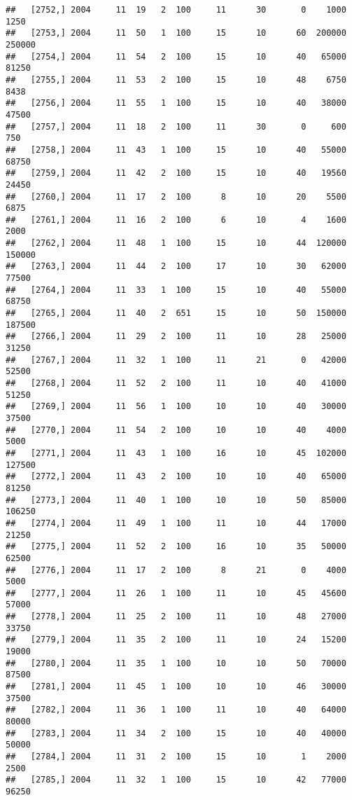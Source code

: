 \documentclass{article}\usepackage[]{graphicx}\usepackage[]{color}
\makeatletter
\newenvironment{kframe}{%
 \def\at@end@of@kframe{}%
 \ifinner\ifhmode%
  \def\at@end@of@kframe{\end{minipage}}%
  \begin{minipage}{\columnwidth}%
 \fi\fi%
 \def\FrameCommand##1{\hskip\@totalleftmargin \hskip-\fboxsep
 \colorbox{shadecolor}{##1}\hskip-\fboxsep
     \hskip-\linewidth \hskip-\@totalleftmargin \hskip\columnwidth}%
 \MakeFramed {\advance\hsize-\width
   \@totalleftmargin\z@ \linewidth\hsize
   \@setminipage}}%
 {\par\unskip\endMakeFramed%
 \at@end@of@kframe}
\newenvironment{knitrout}{}{} %
\makeatother
\begin{document}
\begin{knitrout}
\begin{kframe}
\begin{verbatim}
##   [2752,] 2004     11  19   2  100     11      30       0    1000    1250
##   [2753,] 2004     11  50   1  100     15      10      60  200000  250000
##   [2754,] 2004     11  54   2  100     15      10      40   65000   81250
##   [2755,] 2004     11  53   2  100     15      10      48    6750    8438
##   [2756,] 2004     11  55   1  100     15      10      40   38000   47500
##   [2757,] 2004     11  18   2  100     11      30       0     600     750
##   [2758,] 2004     11  43   1  100     15      10      40   55000   68750
##   [2759,] 2004     11  42   2  100     15      10      40   19560   24450
##   [2760,] 2004     11  17   2  100      8      10      20    5500    6875
##   [2761,] 2004     11  16   2  100      6      10       4    1600    2000
##   [2762,] 2004     11  48   1  100     15      10      44  120000  150000
##   [2763,] 2004     11  44   2  100     17      10      30   62000   77500
##   [2764,] 2004     11  33   1  100     15      10      40   55000   68750
##   [2765,] 2004     11  40   2  651     15      10      50  150000  187500
##   [2766,] 2004     11  29   2  100     11      10      28   25000   31250
##   [2767,] 2004     11  32   1  100     11      21       0   42000   52500
##   [2768,] 2004     11  52   2  100     11      10      40   41000   51250
##   [2769,] 2004     11  56   1  100     10      10      40   30000   37500
##   [2770,] 2004     11  54   2  100     10      10      40    4000    5000
##   [2771,] 2004     11  43   1  100     16      10      45  102000  127500
##   [2772,] 2004     11  43   2  100     10      10      40   65000   81250
##   [2773,] 2004     11  40   1  100     10      10      50   85000  106250
##   [2774,] 2004     11  49   1  100     11      10      44   17000   21250
##   [2775,] 2004     11  52   2  100     16      10      35   50000   62500
##   [2776,] 2004     11  17   2  100      8      21       0    4000    5000
##   [2777,] 2004     11  26   1  100     11      10      45   45600   57000
##   [2778,] 2004     11  25   2  100     11      10      48   27000   33750
##   [2779,] 2004     11  35   2  100     11      10      24   15200   19000
##   [2780,] 2004     11  35   1  100     10      10      50   70000   87500
##   [2781,] 2004     11  45   1  100     10      10      46   30000   37500
##   [2782,] 2004     11  36   1  100     11      10      40   64000   80000
##   [2783,] 2004     11  34   2  100     15      10      40   40000   50000
##   [2784,] 2004     11  31   2  100     15      10       1    2000    2500
##   [2785,] 2004     11  32   1  100     15      10      42   77000   96250

\end{verbatim}
\end{kframe}
\end{knitrout}
\end{document}
